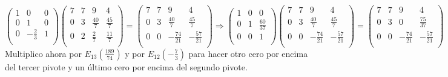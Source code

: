 \documentclass[11pt, a4paper]{article}
\newif\IfInSansMode
\theoremstyle{theorem-style}
\theoremstyle{definition-style}
\theoremstyle{remark-style}
\theoremstyle{example-style}
\begin{document}
$\begin{pmatrix}
1 & 0 & 0 \\
0 & 1 & 0 \\
0 & -\frac{2}{3} & 1 \\
\end{pmatrix} 
\begin{pmatrix}
7 & 7 & 9 & 4 \\
0 & 3 & \frac{40}{7} & \frac{45}{7} \\
0 & 2 & \frac{2}{7} & \frac{11}{7} \\
\end{pmatrix} =
\begin{pmatrix}
7 & 7 & 9 & 4 \\
0 & 3 & \frac{40}{7} & \frac{45}{7} \\
0 & 0 & -\frac{74}{21} & -\frac{57}{21} \\
\end{pmatrix} \Longrightarrow
\begin{pmatrix}
1 & 0 & 0 \\
0 & 1 & \frac{60}{37} \\
0 & 0 & 1 \\
\end{pmatrix} 
\begin{pmatrix}
7 & 7 & 9 & 4 \\
0 & 3 & \frac{40}{7} & \frac{45}{7} \\
0 & 0 & -\frac{74}{21} & -\frac{57}{21} \\
\end{pmatrix} = 
\begin{pmatrix}
7 & 7 & 9 & 4 \\
0 & 3 & 0 & \frac{75}{37} \\
0 & 0 & -\frac{74}{21} & -\frac{57}{21} \\
\end{pmatrix}$ \\

Multiplico ahora por $E_{13}(\frac{189}{74})$ y por $E_{12}(-\frac{7}{3})$ para hacer otro cero por encima del tercer pivote y un último cero por encima del segundo pivote. \\
\end{document}
